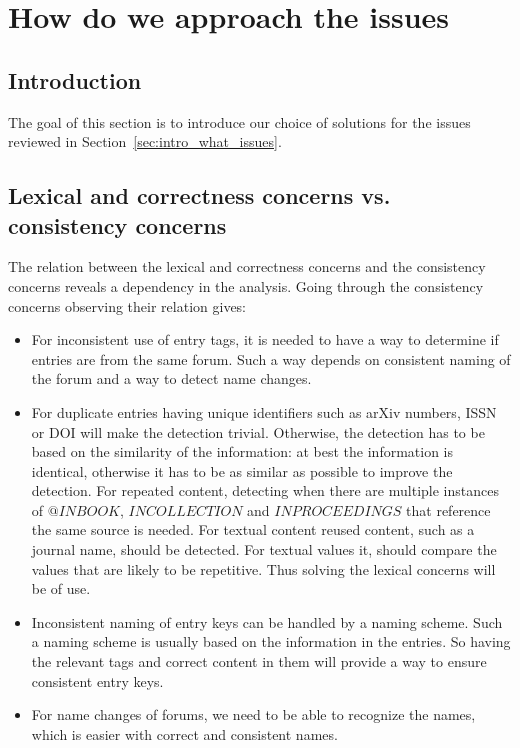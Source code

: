 \section{How do we approach the {\bibtex} issues}
\subsection{Introduction}

The goal of this section is to introduce our choice of solutions for
the issues reviewed in Section~\ref{sec:intro_what_issues}.


\subsection{Lexical and correctness concerns vs. consistency concerns}
\label{sec:approach_lexical_consistency}

The relation between the lexical and correctness concerns and the
consistency concerns reveals a dependency in the analysis.  Going
through the consistency concerns observing their relation gives:

\begin{itemize}
\item For inconsistent use of entry tags, it is needed to have a way
  to determine if entries are from the same forum.  Such a
  way depends on consistent naming of the forum and a way to detect
  name changes.

\item For duplicate entries having unique identifiers such as arXiv
  numbers, ISSN or DOI will make the detection trivial.  Otherwise,
  the detection has to be based on the similarity of the information:
  at best the information is identical, otherwise it has to be as
  similar as possible to improve the detection.  For repeated content,
  detecting when there are multiple instances of $@INBOOK$,
  $INCOLLECTION$ and $INPROCEEDINGS$ that reference the same source is
  needed.  For textual content reused content, such as a journal name,
  should be detected.  For textual values it, should compare the
  values that are likely to be repetitive.  Thus solving the lexical
  concerns will be of use.

\item Inconsistent naming of entry keys can be handled by a naming
  scheme.  Such a naming scheme is usually based on the information in
  the entries.  So having the relevant tags and correct content in
  them will provide a way to ensure consistent entry keys.

\item For name changes of forums, we need to be able to recognize the
  names, which is easier with correct and consistent names.
\end{itemize}

